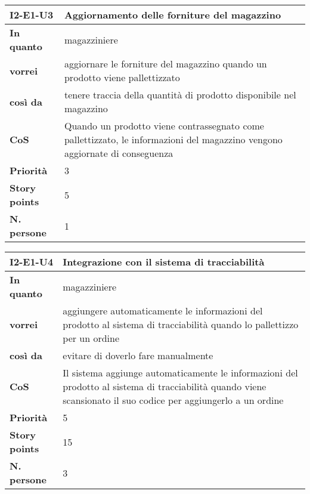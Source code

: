 \begin{table}[H]
  \begin{tabularx}{\textwidth}{lX}
    \toprule
    \textbf{I2-E1-U3} & \textbf{Aggiornamento delle forniture del magazzino} \\
    \midrule
    \textbf{In quanto} & magazziniere \\
    \textbf{vorrei} & aggiornare le forniture del magazzino quando un prodotto viene pallettizzato \\
    \textbf{così da} & tenere traccia della quantità di prodotto disponibile nel magazzino \\
    \midrule
    \textbf{CoS} & Quando un prodotto viene contrassegnato come pallettizzato, le informazioni del magazzino vengono aggiornate di conseguenza \\
    \midrule
    \textbf{Priorità} & 3 \\
    \textbf{Story points} & 5 \\
    \textbf{N. persone} & 1 \\
    \bottomrule
  \end{tabularx}
  \label{user-story:i2-e1-u3}
\end{table}

\begin{table}[H]
  \begin{tabularx}{\textwidth}{lX}
    \toprule
    \textbf{I2-E1-U4} & \textbf{Integrazione con il sistema di tracciabilità} \\
    \midrule
    \textbf{In quanto} & magazziniere \\
    \textbf{vorrei} & aggiungere automaticamente le informazioni del prodotto al sistema di tracciabilità quando lo pallettizzo per un ordine \\
    \textbf{così da} & evitare di doverlo fare manualmente \\
    \midrule
    \textbf{CoS} & Il sistema aggiunge automaticamente le informazioni del prodotto al sistema di tracciabilità quando viene scansionato il suo codice per aggiungerlo a un ordine \\
    \midrule
    \textbf{Priorità} & 5 \\
    \textbf{Story points} & 15 \\
    \textbf{N. persone} & 3 \\
    \bottomrule
  \end{tabularx}
  \label{user-story:i2-e1-u4}
\end{table}

